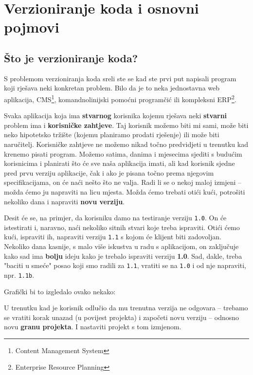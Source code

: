 \chapter*{Verzioniranje koda i osnovni pojmovi}

\section*{Što je verzioniranje koda?}

S problemom verzioniranja koda sreli ste se kad ste prvi put napisali program koji rješava neki konkretan problem. 
Bilo da je to neka jednostavna web aplikacija, CMS\footnote{Content Management System}, komandnolinijski pomoćni programčić ili kompleksni ERP\footnote{Enterprise Resource Planning}.

Svaka aplikacija koja ima \textbf{stvarnog} korisnika kojemu rješava neki \textbf{stvarni} problem ima i \textbf{korisničke zahtjeve}.
Taj korisnik možemo biti mi sami, može biti neko hipotetsko tržište (kojemu planiramo prodati rješenje) ili može biti naručitelj.
Korisničke zahtjeve ne možemo nikad točno predvidjeti u trenutku kad krenemo pisati program.
Možemo satima, danima i mjesecima sjediti s budućim korisnicima i planirati što će sve naša aplikacija imati, ali kad korisnik sjedne pred prvu verziju aplikacije, čak i ako je pisana točno prema njegovim specifikacijama, on će naći nešto što ne valja. 
Radi li se o nekoj maloj izmjeni -- možda ćemo ju napraviti na licu mjesta.
Možda ćemo trebati otići kući, potrošiti nekoliko dana i napraviti \textbf{novu verziju}.

Desit će se, na primjer, da korisniku damo na testiranje verziju \texttt{1.0}.
On će istestirati i, naravno, naći nekoliko sitnih stvari koje treba ispraviti.
Otići ćemo kući, ispraviti ih, napraviti verziju \texttt{1.1} s kojom će klijent biti zadovoljan.
Nekoliko dana kasnije, s malo više iskustva u radu s aplikacijom, on zaključuje kako sad ima \textbf{bolju} ideju kako je trebalo ispraviti verziju \textbf{1.0}.
Sad, dakle, treba "baciti u smeće" posao koji smo radili za \texttt{1.1}, vratiti se na \texttt{1.0} i od nje napraviti, npr. \texttt{1.1b}.

Grafički bi to izgledalo ovako nekako:



U trenutku kad je korisnik odlučio da mu trenutna verzija ne odgovara -- trebamo se vratiti korak unazad (u povijest projekta) i započeti novu verziju -- odnosno novu \textbf{granu projekta}.
I nastaviti projekt s tom izmjenom.

